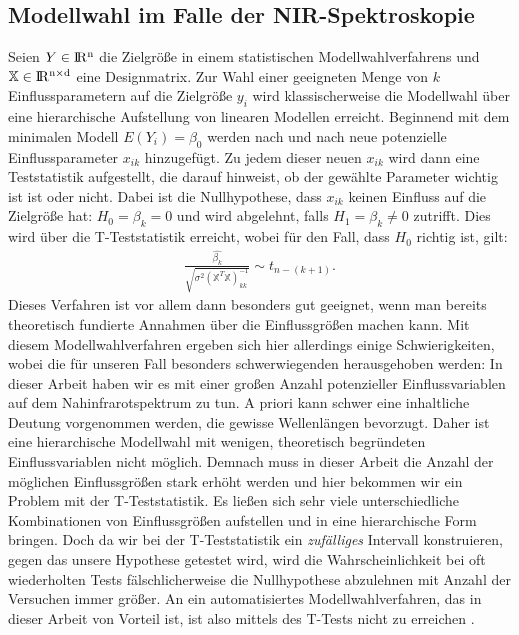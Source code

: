 	\subsection{Modellwahl im Falle der NIR-Spektroskopie}
	\label{ssec:mlr}
	Seien $Y\in \rm I\!R^{n}$ die Zielgröße in einem statistischen Modellwahlverfahrens und $\mathbb{X} \in \rm I\!R^{n \times d}$ eine Designmatrix.
	Zur Wahl einer geeigneten Menge von $k$ Einflussparametern auf die Zielgröße $y_i$  wird klassischerweise die Modellwahl über eine hierarchische Aufstellung von linearen Modellen erreicht. Beginnend mit dem minimalen Modell $E(Y_i) = \beta_0$ werden nach und nach neue potenzielle Einflussparameter $x_{ik}$ hinzugefügt. Zu jedem dieser neuen $x_{ik}$ wird dann eine Teststatistik aufgestellt, die darauf hinweist, ob der gewählte Parameter wichtig ist ist oder nicht. Dabei ist die Nullhypothese, dass $x_{ik}$ keinen Einfluss auf die Zielgröße hat: $ H_0 = \beta_k = 0$ und wird abgelehnt, falls $H_1 = \beta_k \neq 0$ zutrifft.
	Dies wird über die T-Teststatistik erreicht,  wobei für den Fall, dass $H_0$ richtig ist, gilt:
	\begin{align*}
	\frac{\hat{\beta_k}}{\sqrt{\sigma^2(\mathbb{X}^T\mathbb{X})^{-1}_{kk}}} \sim t_{n-(k+1)}.
	\end{align*}
	Dieses Verfahren ist vor allem dann besonders gut geeignet, wenn man bereits theoretisch fundierte Annahmen über die Einflussgrößen machen kann.
	Mit diesem Modellwahlverfahren ergeben sich hier allerdings einige Schwierigkeiten, wobei die für unseren Fall besonders schwerwiegenden herausgehoben werden: In dieser Arbeit haben wir es mit einer großen Anzahl potenzieller Einflussvariablen auf dem Nahinfrarotspektrum zu tun. A priori kann schwer eine inhaltliche Deutung vorgenommen werden, die gewisse Wellenlängen bevorzugt. Daher ist eine hierarchische Modellwahl mit wenigen, theoretisch begründeten Einflussvariablen nicht möglich. Demnach muss in dieser Arbeit die Anzahl der möglichen Einflussgrößen stark erhöht werden und hier bekommen wir ein Problem mit der T-Teststatistik. Es ließen sich sehr viele unterschiedliche Kombinationen von Einflussgrößen aufstellen und in eine hierarchische Form bringen. Doch da wir bei der T-Teststatistik ein \textit{zufälliges} Intervall konstruieren, gegen das unsere Hypothese getestet wird, wird die Wahrscheinlichkeit bei oft wiederholten Tests fälschlicherweise die Nullhypothese abzulehnen mit Anzahl der Versuchen immer größer. An ein automatisiertes Modellwahlverfahren, das in dieser Arbeit von Vorteil ist, ist also mittels des T-Tests nicht zu erreichen \cite{Schumacher.2019}.
